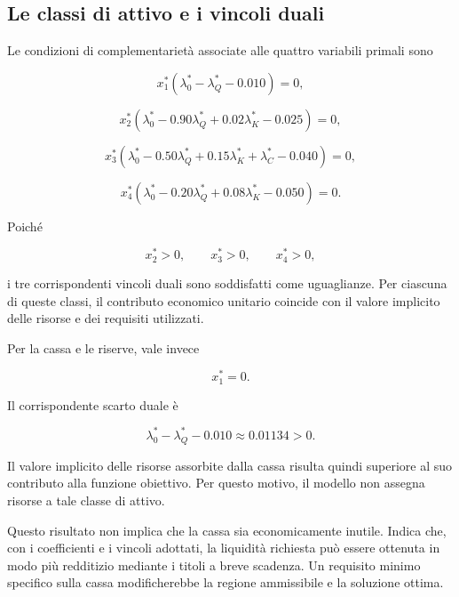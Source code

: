 \subsection{Le classi di attivo e i vincoli duali}

Le condizioni di complementariet\`a associate alle quattro variabili primali
sono

\[
x_1^*
\left(
\lambda_0^*-\lambda_Q^*-0.010
\right)
=
0,
\]

\[
x_2^*
\left(
\lambda_0^*
-
0.90\lambda_Q^*
+
0.02\lambda_K^*
-
0.025
\right)
=
0,
\]

\[
x_3^*
\left(
\lambda_0^*
-
0.50\lambda_Q^*
+
0.15\lambda_K^*
+
\lambda_C^*
-
0.040
\right)
=
0,
\]

\[
x_4^*
\left(
\lambda_0^*
-
0.20\lambda_Q^*
+
0.08\lambda_K^*
-
0.050
\right)
=
0.
\]

Poich\'e

\[
x_2^*>0,
\qquad
x_3^*>0,
\qquad
x_4^*>0,
\]

\noindent i tre corrispondenti vincoli duali sono soddisfatti come uguaglianze. Per
ciascuna di queste classi, il contributo economico unitario coincide con il
valore implicito delle risorse e dei requisiti utilizzati.

Per la cassa e le riserve, vale invece

\[
x_1^*=0.
\]

Il corrispondente scarto duale \`e

\[
\lambda_0^*
-
\lambda_Q^*
-
0.010
\approx
0.01134
>
0.
\]

Il valore implicito delle risorse assorbite dalla cassa risulta quindi
superiore al suo contributo alla funzione obiettivo. Per questo motivo, il
modello non assegna risorse a tale classe di attivo.

Questo risultato non implica che la cassa sia economicamente inutile. Indica
che, con i coefficienti e i vincoli adottati, la liquidit\`a richiesta pu\`o
essere ottenuta in modo pi\`u redditizio mediante i titoli a breve scadenza.
Un requisito minimo specifico sulla cassa modificherebbe la regione
ammissibile e la soluzione ottima.

